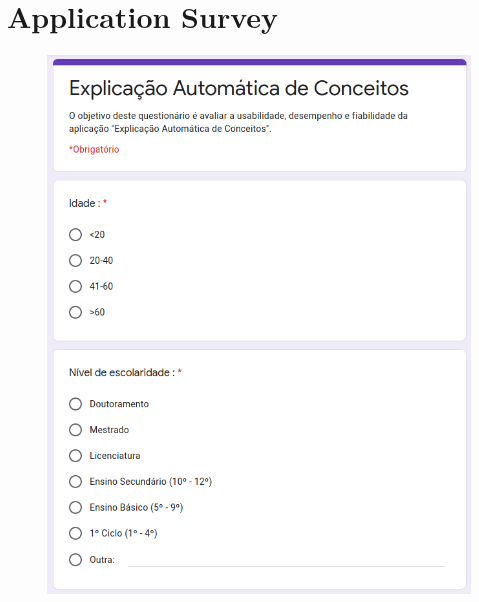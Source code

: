 
\chapter{Application Survey} %

\label{AppendixA} %

\begin{figure}[H]
    \centering
    \includegraphics[scale=0.7]{appendices/assets/survey1.png}
    \label{fig:survey1}
\end{figure}

